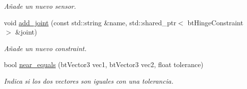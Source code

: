 \begin{DoxyCompactItemize}
\begin{DoxyCompactList}\small\item\em Añade un nuevo sensor. \end{DoxyCompactList}\item 
void \mbox{\hyperlink{classexample_1_1_entity_a689cfcb3f6a4e30d2bdab97d94a4e3fd}{add\+\_\+joint}} (const std\+::string \&name, std\+::shared\+\_\+ptr$<$ bt\+Hinge\+Constraint $>$ \&joint)
\begin{DoxyCompactList}\small\item\em Añade un nuevo constraint. \end{DoxyCompactList}\item 
bool \mbox{\hyperlink{classexample_1_1_entity_a26229582d394533c3697192b8f308dfc}{near\+\_\+equals}} (bt\+Vector3 vec1, bt\+Vector3 vec2, float tolerance)
\begin{DoxyCompactList}\small\item\em Indica si los dos vectores son iguales con una tolerancia. \end{DoxyCompactList}\end{DoxyCompactItemize}
